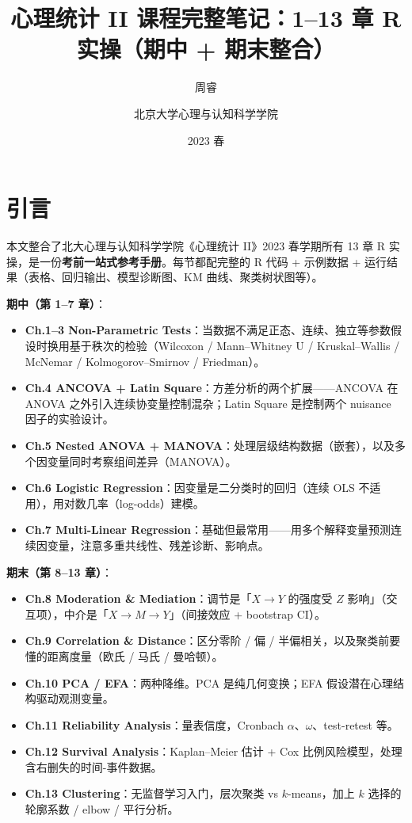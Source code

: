 \documentclass[
]{ctexart}
\title{心理统计 II 课程完整笔记：1--13 章 R 实操（期中 + 期末整合）}
\author{周睿 \and 北京大学心理与认知科学学院}
\date{2023 春}
\begin{document}
\maketitle

{
\setcounter{tocdepth}{2}
\tableofcontents
}
\hypertarget{ux5f15ux8a00}{%
\section{引言}\label{ux5f15ux8a00}}

本文整合了北大心理与认知科学学院《心理统计 II》2023 春学期所有 13 章 R
实操，是一份\textbf{考前一站式参考手册}。每节都配完整的 R 代码 +
示例数据 + 运行结果（表格、回归输出、模型诊断图、KM
曲线、聚类树状图等）。

\begin{keypoint}[13 章一句话导览]
\textbf{期中（第 1--7 章）}：
\begin{itemize}
\item \textbf{Ch.1--3 Non-Parametric Tests}：当数据不满足正态、连续、独立等参数假设时换用基于秩次的检验（Wilcoxon / Mann--Whitney U / Kruskal--Wallis / McNemar / Kolmogorov--Smirnov / Friedman）。
\item \textbf{Ch.4 ANCOVA + Latin Square}：方差分析的两个扩展——ANCOVA 在 ANOVA 之外引入连续协变量控制混杂；Latin Square 是控制两个 nuisance 因子的实验设计。
\item \textbf{Ch.5 Nested ANOVA + MANOVA}：处理层级结构数据（嵌套），以及多个因变量同时考察组间差异（MANOVA）。
\item \textbf{Ch.6 Logistic Regression}：因变量是二分类时的回归（连续 OLS 不适用），用对数几率（log-odds）建模。
\item \textbf{Ch.7 Multi-Linear Regression}：基础但最常用——用多个解释变量预测连续因变量，注意多重共线性、残差诊断、影响点。
\end{itemize}

\textbf{期末（第 8--13 章）}：
\begin{itemize}
\item \textbf{Ch.8 Moderation \& Mediation}：调节是「$X \to Y$ 的强度受 $Z$ 影响」（交互项），中介是「$X \to M \to Y$」（间接效应 + bootstrap CI）。
\item \textbf{Ch.9 Correlation \& Distance}：区分零阶 / 偏 / 半偏相关，以及聚类前要懂的距离度量（欧氏 / 马氏 / 曼哈顿）。
\item \textbf{Ch.10 PCA / EFA}：两种降维。PCA 是纯几何变换；EFA 假设潜在心理结构驱动观测变量。
\item \textbf{Ch.11 Reliability Analysis}：量表信度，Cronbach $\alpha$、$\omega$、test-retest 等。
\item \textbf{Ch.12 Survival Analysis}：Kaplan--Meier 估计 + Cox 比例风险模型，处理含右删失的时间-事件数据。
\item \textbf{Ch.13 Clustering}：无监督学习入门，层次聚类 vs $k$-means，加上 $k$ 选择的轮廓系数 / elbow / 平行分析。
\end{itemize}
\end{keypoint}
\end{document}
